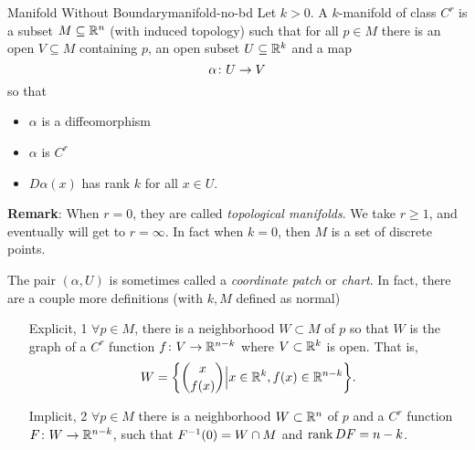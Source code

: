 \documentclass{article}
\begin{document}

\begin{definition}{Manifold Without Boundary}{manifold-no-bd}
  Let $k > 0$. A $k$-manifold of class $C^{r}$ is a subset $M \subseteq \RR[n]$ (with induced topology)
  such that for all $p \in M$ there is an open $V \subseteq M$ containing $p$, an open subset $U \subseteq \RR[k]$ and a map
  \[ \alpha \from U \to V \]
  so that
  \begin{itemize}
    \item $\alpha$ is a diffeomorphism
    \item $\alpha$ is $C^{r}$
    \item $D\alpha(x)$ has rank $k$ for all $x \in U$.
  \end{itemize}
\end{definition}

\textbf{Remark}:
  When $r = 0$, they are called \emph{topological manifolds}.
  We take $r \ge 1$, and eventually will get to $r = \infty$.
  In fact when $k = 0$, then $M$ is a set of discrete points.

The pair $(\alpha, U)$ is sometimes called a \emph{coordinate patch} or \emph{chart}.
In fact, there are a couple more definitions (with $k, M$ defined as normal)
\begin{enumerate}[start=1,label={\arabic*\rparen}]
  \item[Explicit, 1\rparen]
        $\forall p \in M$, there is a neighborhood $W \subset M$ of $p$ so that $W$ is the graph
        of a $C^{r}$ function $f \from V \to \RR[n - k]$ where $V \subset \RR[k]$ is open.
        That is,
        \[ W = \set*{ \binom{x}{f(x)} \Big| x \in \RR[k], f(x) \in \RR[n - k] }. \]

  \item[Implicit, 2\rparen]
        $\forall p \in M$ there is a neighborhood $W \subset \RR[n]$ of $p$ and
        a $C^{r}$ function $F \from W \to \RR[n - k]$, such that $F\inv(0) = W \cap M$
        and $\rank DF = n - k$.
\end{enumerate}
\end{document}
